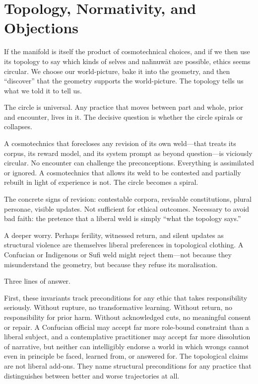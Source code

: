 \section{Topology, Normativity, and Objections}

If the manifold is itself the product of cosmotechnical choices, and if we then use its topology to say which kinds of selves and na\={h}nuw\={a}t are possible, ethics seems circular. We choose our world-picture, bake it into the geometry, and then ``discover'' that the geometry supports the world-picture. The topology tells us what we told it to tell us.

The circle is universal. Any practice that moves between part and whole, prior and encounter, lives in it. The decisive question is whether the circle spirals or collapses.

A cosmotechnics that forecloses any revision of its own weld---that treats its corpus, its reward model, and its system prompt as beyond question---is viciously circular. No encounter can challenge the preconceptions. Everything is assimilated or ignored. A cosmotechnics that allows its weld to be contested and partially rebuilt in light of experience is not. The circle becomes a spiral.

The concrete signs of revision: contestable corpora, revisable constitutions, plural personae, visible updates. Not sufficient for ethical outcomes. Necessary to avoid bad faith: the pretence that a liberal weld is simply ``what the topology says.''

A deeper worry. Perhaps ferility, witnessed return, and silent updates as structural violence are themselves liberal preferences in topological clothing. A Confucian or Indigenous or Sufi weld might reject them---not because they misunderstand the geometry, but because they refuse its moralisation.

Three lines of answer.

First, these invariants track preconditions for any ethic that takes responsibility seriously. Without rupture, no transformative learning. Without return, no responsibility for prior harm. Without acknowledged cuts, no meaningful consent or repair. A Confucian official may accept far more role-bound constraint than a liberal subject, and a contemplative practitioner may accept far more dissolution of narrative, but neither can intelligibly endorse a world in which wrongs cannot even in principle be faced, learned from, or answered for. The topological claims are not liberal add-ons. They name structural preconditions for any practice that distinguishes between better and worse trajectories at all.

